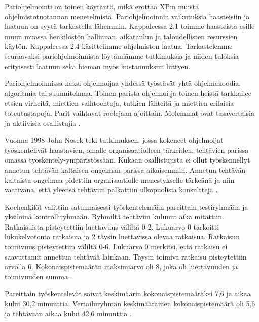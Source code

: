 \documentclass[finnish]{tktltiki2}
\theoremstyle{definition}
\theoremstyle{remark}
\begin{document}
Pariohjelmointi on toinen käytäntö, mikä erottaa XP:n muista ohjelmistotuotannon menetelmistä. Pariohjelmoinnin vaikutuksia haasteisiin ja laatuun on syytä tarkastella lähemmin. Kappaleessa 2.1 toimme haasteista esille muun muassa henkilöstön hallinnan, aikataulun ja taloudellisten resurssien käytön. Kappaleessa 2.4 käsittelimme ohjelmiston laatua. Tarkastelemme seuraavaksi pariohjelmoinnista löytämiämme tutkimuksia ja niiden tuloksia erityisesti laatuun sekä hieman myös kustannuksiin liittyen.

Pariohjelmoinnissa kaksi ohjelmoijaa yhdessä työstävät yhtä ohjelmakoodia, algoritmia tai suunnitelmaa. Toinen parista ohjelmoi ja toinen heistä tarkkailee etsien virheitä, miettien vaihtoehtoja, tutkien lähteitä ja miettien erilaisia toteutustapoja. Parit vaihtavat roolejaan ajoittain. Molemmat ovat tasavertaisia ja aktiivisia osallistujia \cite{WIL00}.

Vuonna 1998 John Nosek teki tutkimuksen, jossa kokeneet ohjelmoijat työskentelivät haastavien, omalle organisaatiolleen tärkeiden, tehtävien parissa omassa työskentely-ympäristössään. Kukaan osallistujista ei ollut työskennellyt annetun tehtävän kaltaisen ongelman parissa aikaisemmin. Annetun tehtävän kaltaista ongelmaa pidettiin organisaatiolle menestykselle tärkeänä ja niin vaativana, että yleensä tehtäviin palkattiin ulkopuolisia konsultteja \cite{NOS98}.

Koehenkilöt valittiin satunnaisesti työskentelemään pareittain testiryhmään ja yksilöinä kontrolliryhmään.
Ryhmiltä tehtäviin kulunut aika mitattiin. Ratkaisuista pisteytettiin luettavuus väliltä 0-2. Lukuarvo 0 tarkoitti lukukelvotonta ratkaisua ja 2 täysin luettavissa olevaa ratkaisua. Ratkaisun toimivuus pisteytettiin väliltä 0-6. Lukuarvo 0 merkitsi, että ratkaisu ei saavuttanut annettua tehtävää lainkaan. Täysin toimiva ratkaisu pisteytettiin arvolla 6. Kokonaispistemäärän maksimiarvo oli 8, joka oli luettavuuden ja toimivuuden summa \cite{NOS98}.

Pareittain työskentelevät saivat keskimäärin kokonaispistemääräksi 7,6 ja aikaa kului 30,2 minuuttia. Vertailuryhmän keskimääräinen kokonaispistemäärä oli 5,6 ja tehtävään aikaa kului 42,6 minuuttia \cite{NOS98}.
\end{document}

